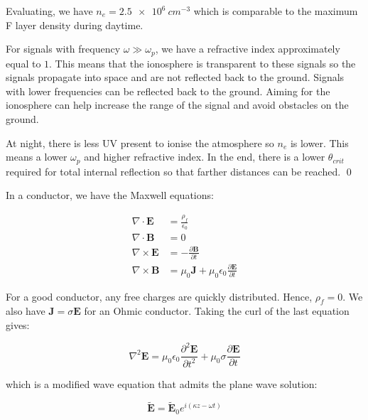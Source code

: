 \documentclass[12pt]{article}
\begin{document}
Evaluating, we have $n_{e} = \qty{2.5e6}{cm^{-3}}$ which is comparable to the maximum F layer density during daytime.

For signals with frequency $\omega \gg \omega_{p}$, we have a refractive index approximately equal to $1$. This means that the ionosphere is transparent to these signals so the signals propagate into space and are not reflected back to the ground. Signals with lower frequencies can be reflected back to the ground. Aiming for the ionosphere can help increase the range of the signal and avoid obstacles on the ground.

At night, there is less UV present to ionise the atmosphere so $n_{e}$ is lower. This means a lower $\omega_{p}$ and higher refractive index. In the end, there is a lower $\theta_{crit}$ required for total internal reflection so that farther distances can be reached.
\qed



In a conductor, we have the Maxwell equations:

\begin{equation}
\begin{split}
    \nabla \cdot \mathbf{E} &= \frac{\rho_{f}}{\epsilon_{0}} \\
    \nabla \cdot \mathbf{B} &= 0 \\
    \nabla \times \mathbf{E} &= -\frac{\partial \mathbf{B}}{\partial t} \\
    \nabla \times \mathbf{B} &= \mu_{0} \mathbf{J} + \mu_{0} \epsilon_{0} \frac{\partial \mathbf{E}}{\partial t}
\end{split}
\end{equation}

For a good conductor, any free charges are quickly distributed. Hence, $\rho_{f} = 0$. We also have $\mathbf{J} = \sigma \mathbf{E}$ for an Ohmic conductor. Taking the curl of the last equation gives:

\begin{equation}
    \nabla^{2} \mathbf{E} = \mu_{0} \epsilon_{0} \frac{\partial^{2} \mathbf{E}}{\partial t^{2}} + \mu_{0} \sigma \frac{\partial \mathbf{E}}{\partial t}
\end{equation}

which is a modified wave equation that admits the plane wave solution:

\begin{equation}
    \tilde{\mathbf{E}} = \tilde{\mathbf{E}}_{0} e^{i(\kappa z - \omega t)}
\end{equation}
\end{document}
